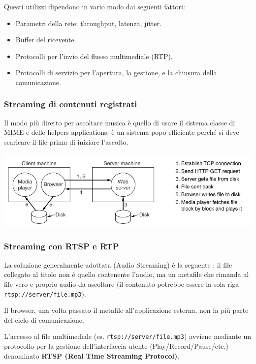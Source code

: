         Questi utilizzi dipendono in vario modo dai seguenti fattori:
        \begin{itemize}
            \item Parametri della rete: throughput, latenza, jitter.
            \item Buffer del ricevente.
            \item Protocolli per l'invio del flusso multimediale (RTP).
            \item Protocolli di servizio per l'apertura, la gestione, e la chiusura della comunicazione.
        \end{itemize}

        \subsubsection{Streaming di contenuti registrati}
            Il modo più diretto per ascoltare musica è quello di usare il sistema classe di MIME e delle helpers applications: è un sistema popo efficiente perché si deve scaricare il file prima di iniziare l'ascolto.

            \begin{center}
                \includegraphics[scale=0.36]{chapters/6/assets/schema_za.png}
            \end{center}

        \subsubsection{Streaming con RTSP e RTP}
            La soluzione generalmente adottata (Audio Streaming) è la seguente : il file collegato al titolo non è quello contenente l'audio, ma un metafile che rimanda al file vero e proprio audio da ascoltare (il contenuto potrebbe essere la sola riga \verb|rtsp://server/file.mp3|).
        
            Il browser, una volta passato il metafile all'applicazione esterna, non fa più parte del ciclo di comunicazione.

            L'accesso al file multimediale (es. \verb|rtsp://server/file.mp3|) avviene mediante un protocollo per la gestione dell'interfaccia utente (Play/Record/Pause/etc.) denominato \textbf{RTSP (Real Time Streaming Protocol)}.


